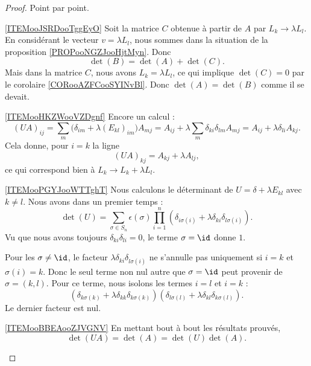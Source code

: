\begin{proof}
    Point par point.
    \begin{subproof}
    \item[\ref{ITEMooJSRDooTggEyO}]
        Soit la matrice \( C\) obtenue à partir de \( A\) par \( L_k\to \lambda L_l\). En considérant le vecteur \( v=\lambda L_l\), nous sommes dans la situation de la proposition \ref{PROPooNGZJooHjtMyn}. Donc
        \begin{equation}
            \det(B)=\det(A)+\det(C).
        \end{equation}
        Mais dans la matrice \( C\), nous avons \( L_k=\lambda L_l\), ce qui implique \( \det(C)=0\) par le corolaire \ref{CORooAZFCooSYINvBl}. Donc \( \det(A)=\det(B)\) comme il se devait.
    \item[\ref{ITEMooHKZWooVZDgnf}]
        Encore un calcul :
        \begin{equation}
            (UA)_{ij}=\sum_m\big( \delta_{im}+\lambda(E_{kl})_{im} \big)A_{mj}=A_{ij}+\lambda\sum_m\delta_{ki}\delta_{lm}A_{mj}=A_{ij}+\lambda \delta_{li}A_{kj}.
        \end{equation}
        Cela donne, pour \( i=k\) la ligne
        \begin{equation}
            (UA)_{kj}=A_{kj}+\lambda A_{lj},
        \end{equation}
        ce qui correspond bien à \( L_k\to L_k+\lambda L_l\).

    \item[\ref{ITEMooPGYJooWTTghT}]
            Nous calculons le déterminant de \( U=\delta+\lambda E_{kl}\) avec \( k\neq l\). Nous avons dans un premier temps :
            \begin{equation}
                \det(U)=\sum_{\sigma\in S_n}\epsilon(\sigma)\prod_{i=1}^n(\delta_{i\sigma(i)}+\lambda \delta_{ki}\delta_{l\sigma(i)}).
            \end{equation}
            Vu que nous avons toujours \( \delta_{ki}\delta_{li}=0\), le terme \( \sigma=\id\) donne \( 1\).

            Pour les \( \sigma\neq \id\), le facteur \( \lambda\delta_{ki}\delta_{l\sigma(i)}\) ne s'annulle pas uniquement si \( i=k\) et \( \sigma(i)=k\). Donc le seul terme non nul autre que \( \sigma=\id\) peut provenir de \( \sigma=(k,l)\). Pour ce terme, nous isolons les termes \( i=l\) et \( i=k\) :
            \begin{equation}
                (\delta_{k\sigma(k)}+\lambda\delta_{kk}\delta_{k\sigma(k)})(\delta_{l\sigma(l)}+\lambda\delta_{kl}\delta_{k\sigma(l)}).
            \end{equation}
            Le dernier facteur est nul.
        \item[\ref{ITEMooBBEAooZJVGNV}]
            En mettant bout à bout les résultats prouvés,
            \begin{equation}
                \det(UA)=\det(A)=\det(U)\det(A).
            \end{equation}
    \end{subproof}
\end{proof}

